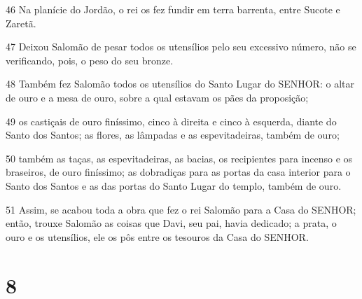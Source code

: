 \par 46 Na planície do Jordão, o rei os fez fundir em terra barrenta, entre Sucote e Zaretã.
\par 47 Deixou Salomão de pesar todos os utensílios pelo seu excessivo número, não se verificando, pois, o peso do seu bronze.
\par 48 Também fez Salomão todos os utensílios do Santo Lugar do SENHOR: o altar de ouro e a mesa de ouro, sobre a qual estavam os pães da proposição;
\par 49 os castiçais de ouro finíssimo, cinco à direita e cinco à esquerda, diante do Santo dos Santos; as flores, as lâmpadas e as espevitadeiras, também de ouro;
\par 50 também as taças, as espevitadeiras, as bacias, os recipientes para incenso e os braseiros, de ouro finíssimo; as dobradiças para as portas da casa interior para o Santo dos Santos e as das portas do Santo Lugar do templo, também de ouro.
\par 51 Assim, se acabou toda a obra que fez o rei Salomão para a Casa do SENHOR; então, trouxe Salomão as coisas que Davi, seu pai, havia dedicado; a prata, o ouro e os utensílios, ele os pôs entre os tesouros da Casa do SENHOR.

\chapter{8}

